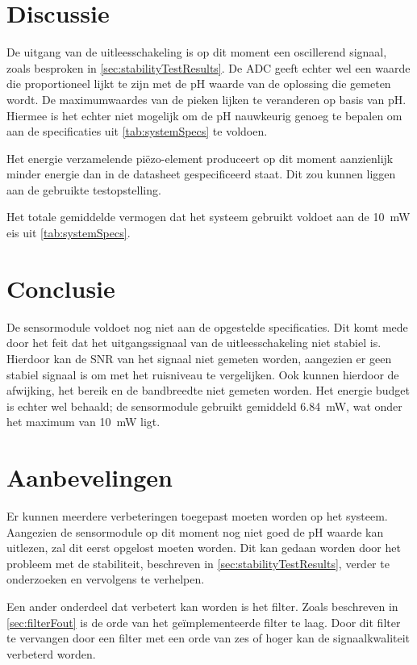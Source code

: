 \section{Discussie}
De uitgang van de uitleesschakeling is op dit moment een oscillerend signaal, zoals besproken in \cref{sec:stabilityTestResults}. De ADC geeft echter wel een waarde die proportioneel lijkt te zijn met de pH waarde van de oplossing die gemeten wordt.
De maximumwaardes van de pieken lijken te veranderen op basis van pH. Hiermee is het echter niet mogelijk om de pH nauwkeurig genoeg te bepalen om aan de specificaties uit \cref{tab:systemSpecs} te voldoen.

Het energie verzamelende piëzo-element produceert op dit moment aanzienlijk minder energie dan in de datasheet gespecificeerd staat. Dit zou kunnen liggen aan de gebruikte testopstelling.

Het totale gemiddelde vermogen dat het systeem gebruikt voldoet aan de \qty{10}{\milli\watt} eis uit \cref{tab:systemSpecs}.

\newpage
\section{Conclusie}
De sensormodule voldoet nog niet aan de opgestelde specificaties. Dit komt mede door het feit dat het uitgangssignaal van de uitleesschakeling niet stabiel is. Hierdoor kan de SNR van het signaal niet gemeten worden, aangezien er geen stabiel signaal is om met het ruisniveau te vergelijken. Ook kunnen hierdoor de afwijking, het bereik en de bandbreedte niet gemeten worden.
Het energie budget is echter wel behaald; de sensormodule gebruikt gemiddeld \qty{6.84}{\milli\watt}, wat onder het maximum van \qty{10}{\milli\watt} ligt.




\newpage
\section{Aanbevelingen}
Er kunnen meerdere verbeteringen toegepast moeten worden op het systeem. Aangezien de sensormodule op dit moment nog niet goed de pH waarde kan uitlezen, zal dit eerst opgelost moeten worden. Dit kan gedaan worden door het probleem met de stabiliteit, beschreven in \cref{sec:stabilityTestResults}, verder te onderzoeken en vervolgens te verhelpen.

Een ander onderdeel dat verbetert kan worden is het filter. Zoals beschreven in \cref{sec:filterFout} is de orde van het geïmplementeerde filter te laag. Door dit filter te vervangen door een filter met een orde van zes of hoger kan de signaalkwaliteit verbeterd worden.


